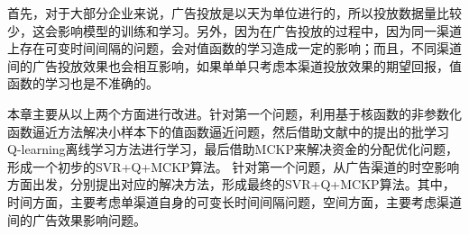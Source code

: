 首先，对于大部分企业来说，广告投放是以天为单位进行的，所以投放数据量比较少，这会影响模型的训练和学习。另外，因为在广告投放的过程中，因为同一渠道上存在可变时间间隔的问题，会对值函数的学习造成一定的影响；而且，不同渠道间的广告投放效果也会相互影响，如果单单只考虑本渠道投放效果的期望回报，值函数的学习也是不准确的。

本章主要从以上两个方面进行改进。针对第一个问题，利用基于核函数的非参数化函数逼近方法解决小样本下的值函数逼近问题，然后借助文献\citep{pednault2002sequential}中的提出的批学习Q-learning离线学习方法进行学习，最后借助MCKP来解决资金的分配优化问题，形成一个初步的SVR+Q+MCKP算法。
针对第一个问题，从广告渠道的时空影响方面出发，分别提出对应的解决方法，形成最终的SVR+Q+MCKP算法。其中，时间方面，主要考虑单渠道自身的可变长时间间隔问题，空间方面，主要考虑渠道间的广告效果影响问题。